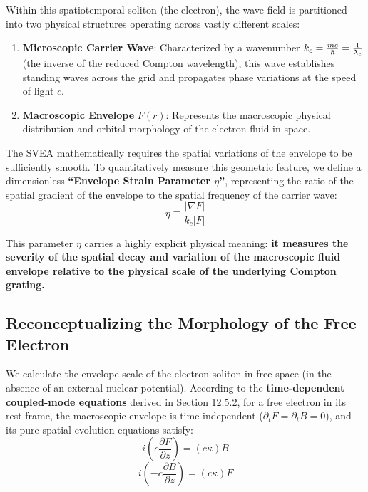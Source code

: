 \documentclass[12pt, a4paper]{article}
\newcommand{\lambdabar}{{\mkern0.75mu\mathchar '26\mkern -9.75mu\lambda}}
\begin{document}
Within this spatiotemporal soliton (the electron), the wave field is partitioned into two physical structures operating across vastly different scales:
\begin{enumerate}
    \item \textbf{Microscopic Carrier Wave}: Characterized by a wavenumber $k_c = \frac{mc}{\hbar} = \frac{1}{\lambdabar_c}$ (the inverse of the reduced Compton wavelength), this wave establishes standing waves across the grid and propagates phase variations at the speed of light $c$.
    \item \textbf{Macroscopic Envelope} $F(r)$: Represents the macroscopic physical distribution and orbital morphology of the electron fluid in space.
\end{enumerate}

The SVEA mathematically requires the spatial variations of the envelope to be sufficiently smooth. To quantitatively measure this geometric feature, we define a dimensionless \textbf{``Envelope Strain Parameter $\eta$''}, representing the ratio of the spatial gradient of the envelope to the spatial frequency of the carrier wave:
\begin{equation}
    \eta \equiv \frac{|\nabla F|}{k_c |F|} 
\end{equation}

This parameter $\eta$ carries a highly explicit physical meaning: \textbf{it measures the severity of the spatial decay and variation of the macroscopic fluid envelope relative to the physical scale of the underlying Compton grating.}

\subsection{Reconceptualizing the Morphology of the Free Electron}

We calculate the envelope scale of the electron soliton in free space (in the absence of an external nuclear potential). According to the \textbf{time-dependent coupled-mode equations} derived in Section 12.5.2, for a free electron in its rest frame, the macroscopic envelope is time-independent ($\partial_t F = \partial_t B = 0$), and its pure spatial evolution equations satisfy:
\begin{equation}
    i \left( c \frac{\partial F}{\partial z} \right) = (c\kappa) B 
\end{equation}
\begin{equation}
    i \left( -c \frac{\partial B}{\partial z} \right) = (c\kappa) F 
\end{equation}
\end{document}
